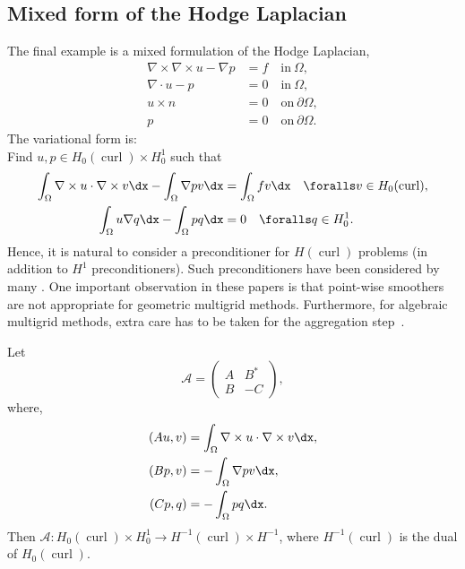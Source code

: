 \subsection{Mixed form of the Hodge Laplacian}
The final example is a mixed formulation
of the Hodge Laplacian,
\begin{align}
\nabla \times \nabla \times u - \nabla p &= f \quad \mbox{in} \ \Omega,    \label{mixed:hodge1} \\
\nabla \cdot u -p &=  0 \quad \mbox{in} \ \Omega, \label{mixed:hodge2} \\
             u \times n &=  0 \quad \mbox{on} \ \partial \Omega, \\
             p          &=  0 \quad \mbox{on} \ \partial \Omega.
\end{align}
The variational form is: \\
Find $u, p \in H_0(\operatorname{curl}) \times H^1_0$ such that
\begin{align}
\int_\Omega \nabla \times u \cdot \nabla \times v \dx
- \int_\Omega \nabla p v \dx  &= \int_\Omega f v \dx  \quad \foralls v \in H_0(\operatorname{curl}), \\
 \int_\Omega u  \nabla q \dx - \int_\Omega p q \dx   &= 0 \quad
 \foralls q \in H^1_0 .
\end{align}
Hence, it is natural to consider a preconditioner  for
$H(\operatorname{curl})$ problems (in addition to $H^1$
preconditioners). Such preconditioners have been considered by many
\citep{ArnoldFalkWinther1997a,ArnoldFalkWinther2000,Hiptmair1997,Hiptmair1999}.
One important observation in these papers is that point-wise smoothers
are not appropriate for geometric multigrid methods. Furthermore, for
algebraic multigrid methods, extra care has to be taken for the
aggregation
step~\citep{GeeSiefertHuEtAl2006,HuTuminaroBochevEtAl2006}.

Let
\[
\mathcal{A}  =
\begin{pmatrix} A & B^* \\ B & -C \end{pmatrix},
\]
where,
\begin{align}
(A u, v) &= \int_\Omega \nabla \times u \cdot \nabla \times v \dx, \\
(B p, v) &=  - \int_\Omega \nabla p v \dx, \\
(C p, q) &=  - \int_\Omega p q \dx.
\end{align}
Then $\mathcal{A}: H_0(\operatorname{curl}) \times H^1_0 \rightarrow
H^{-1}(\operatorname{curl}) \times H^{-1}$, where
$H^{-1}(\operatorname{curl})$ is the dual of
$H_0(\operatorname{curl})$.

